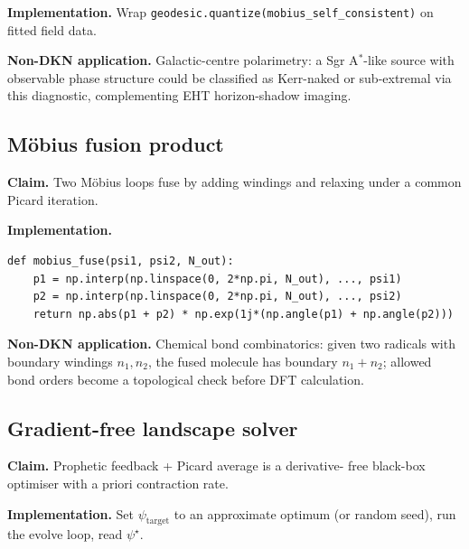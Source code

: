 \documentclass[11pt,a4paper]{article}
\theoremstyle{definition}
\begin{document}
\textbf{Implementation.} Wrap
\texttt{geodesic.quantize(mobius\_self\_consistent)} on fitted field
data.

\begin{tcolorbox}[applbox]
\textbf{Non-DKN application.}
Galactic-centre polarimetry: a Sgr A$^*$-like source with observable
phase structure could be classified as Kerr-naked or sub-extremal via
this diagnostic, complementing EHT horizon-shadow imaging.
\end{tcolorbox}

\subsection{M\"obius fusion product}\label{nov:17}

\begin{tcolorbox}[noveltybox]
\textbf{Claim.} Two M\"obius loops fuse by adding windings and
relaxing under a common Picard iteration.
\end{tcolorbox}

\textbf{Implementation.}
\begin{small}
\begin{verbatim}
def mobius_fuse(psi1, psi2, N_out):
    p1 = np.interp(np.linspace(0, 2*np.pi, N_out), ..., psi1)
    p2 = np.interp(np.linspace(0, 2*np.pi, N_out), ..., psi2)
    return np.abs(p1 + p2) * np.exp(1j*(np.angle(p1) + np.angle(p2)))
\end{verbatim}
\end{small}

\begin{tcolorbox}[applbox]
\textbf{Non-DKN application.}
Chemical bond combinatorics: given two radicals with boundary windings
$n_1, n_2$, the fused molecule has boundary $n_1 + n_2$; allowed bond
orders become a topological check before DFT calculation.
\end{tcolorbox}

\subsection{Gradient-free landscape solver}\label{nov:18}

\begin{tcolorbox}[noveltybox]
\textbf{Claim.} Prophetic feedback + Picard average is a derivative-
free black-box optimiser with a priori contraction rate.
\end{tcolorbox}

\textbf{Implementation.} Set $\psi_{\mathrm{target}}$ to an approximate
optimum (or random seed), run the evolve loop, read $\psi^\star$.
\end{document}
